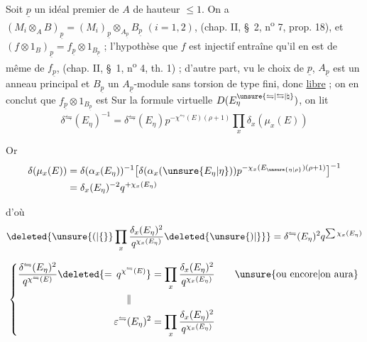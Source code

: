 Soit $\underline p$ un idéal premier de $A$ de hauteur $\leq 1$. On a $(M_i\otimes_A B)_{\underline p}=(M_i)_{\underline p}\otimes_{A_{\underline p}}B_{\underline p}$ $(i=1,2)$, (chap. II, \S~2, n\textsuperscript{o} 7, prop. 18), et $(f\otimes 1_B)_{\underline p}=f_{\underline p}\otimes 1_{B_{\underline p}}$ ; l'hypothèse que $f$ est injectif entraîne qu'il en est de même de $f_{\underline p}$, (chap. II, \S~1, n\textsuperscript{o} 4, th. 1) ; d'autre part, vu le choix de $\underline p$, $A_{\underline p}$ est un anneau principal et $B_{\underline p}$ un $A_{\underline p}$-module sans torsion de type fini, donc \uline{libre} ; on en conclut que $f_{\underline p}\otimes 1_{B_{\underline p}}$ est
Sur la formule virtuelle  $D(E_\eta^{\unsure{\leftrightharpoons|\leftrightarrows|\natural}})$, on lit
\[
\delta^{\leftrightharpoons}(E_\eta)^{-1}=\delta^{\leftrightharpoons}(E_\eta)p^{-\chi^{\leftrightharpoons}(E)(\rho+1)}\prod_x\delta_x(\mu_x(E))
\]

Or
\[
\begin{aligned}
\delta(\mu_x(E))&=\delta(\alpha_x(E_\eta))^{-1}\big[\delta(\alpha_x(\unsure{E_\eta|\eta}))p^{-\chi_x(E_{\unsure{\eta|\rho}})(\rho+1)}\big]^{-1}\\
&=\delta_x(E_\eta)^{-2}q^{+\chi_x(E_\eta)}
\end{aligned}
\]

d'où
\[
\deleted{\unsure{(|\lbrace}}\prod_x\frac{\delta_x(E_\eta)^2}{q^{\chi_x(E_\eta)}}\deleted{\unsure{)|\rbrace}}=
\delta^{\leftrightharpoons}(E_\eta)^2q^{\sum\chi_x(E_\eta)}
\]

\[
\left\{\begin{aligned}
\frac{\delta^{\leftrightharpoons}(E_\eta)^2}{q^{\chi^{\leftrightharpoons}(E)}}\deleted{=\,q^{\chi^{\leftrightharpoons}(E)}}&=\prod_x\frac{\delta_x(E_\eta)^2}{q^{\chi_x(E_\eta)}}\qquad \text{\unsure{ou encore|on aura}}\\
\Vert\qquad&\\
\varepsilon^{\leftrightharpoons}(E_\eta)^2&=\prod_x\frac{\delta_x(E_\eta)^2}{q^{\chi_x(E_\eta)}}
\end{aligned}\right.
\]

